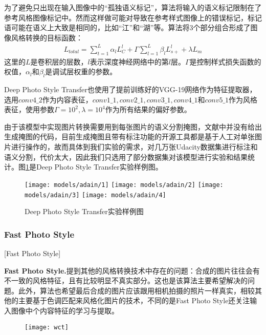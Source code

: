 为了避免只出现在输入图像中的“孤独语义标记”，算法将输入的语义标记限制在了参考风格图像标记中。然而这样做可能对导致在参考样式图像上的错误标记，标记语可能在语义上大致是相同的，比如“江”和“湖”等。算法将3个部分组合形成了图像风格转换的目标函数：
\begin{align}
    L_{total}=\sum_{t=1}^L\alpha_lL_C^l+\Gamma\sum_{l=1}^L \beta_lL_{s+}^l +\lambda L_m
\end{align}
这里的$L$是卷积层的层数，$l$表示深度神经网络中的第$l$层。$\Gamma$是控制样式损失函数的权值，$\alpha_l$和$\beta_l$是调试层权重的参数。

Deep Photo Style Transfer也使用了提前训练好的VGG-19\cite{vgg-19}网络作为特征提取器，选用$conv4\_2$作为内容表征，$conv1\_1,conv2\_1,conv3\_1,conv4\_1$和$conv5\_1$作为风格表征，使用参数$\Gamma=10^2,\lambda=10^4$作为所有结果的偏好参数。

由于该模型中实现图片转换需要用到每张图片的语义分割掩图，文献\cite{dpst}中并没有给出生成掩图的代码，目前生成掩图且带有标注功能的开源工具都是基于人工对单张图片进行操作的，故而具体到我们实验的需求，对几万张Udacity数据集进行标注和语义分割，代价太大，因此我们只选用了部分数据集对该模型进行实验和结果统计。图\ref{fig:dps}是Deep Photo Style Transfer实验样例图。

\begin{figure}[h]
    \centering
    \texttt{[image: models/adain/1]}
    \texttt{[image: models/adain/2]}
    \texttt{[image: models/adain/3]}
    \texttt{[image: models/adain/4]}
    \caption{Deep Photo Style Transfer实验样例图}
    \label{fig:dps}
\end{figure}


\subsubsection{Fast Photo Style}[Fast Photo Style]

\textbf{Fast Photo Style.}\cite{fps}\quad  提到其他的风格转换技术中存在的问题：合成的图片往往会有不一致的风格特征，且有比较明显不真实部分。这也是该算法主要希望解决的问题。此外，算法也希望最后合成的图片应该跟用相机拍摄的照片一样真实，相较其他的主要基于色调匹配来风格化图片的技术，不同的是Fast Photo Style还关注输入图像中个内容特征的学习与提取。

\begin{figure}[t]
    \centering
    \texttt{[image: wct]}
    \caption{}
    \label{wctf}
\end{figure}


